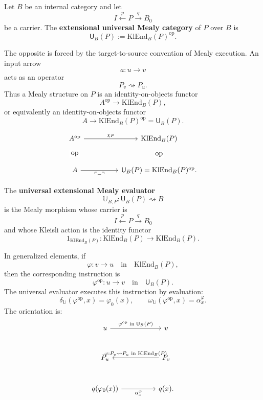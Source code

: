 \begin{definition}
Let \(B\) be an internal category and let
\[
        I \xleftarrow{p} P \xrightarrow{q} B_0
\]
be a carrier.  The \textbf{extensional universal Mealy category} of \(P\) over \(B\) is
\[
        \mathsf U_B(P):=\mathrm{KlEnd}_B(P)^{\operatorname{op}}.
\]
\end{definition}

The opposite is forced by the target-to-source convention of Mealy execution.  An input arrow
\[
        a:u\longrightarrow v
\]
acts as an operator
\[
        P_v\rightsquigarrow P_u.
\]
Thus a Mealy structure on \(P\) is an identity-on-objects functor
\[
        A^{\operatorname{op}}\longrightarrow \mathrm{KlEnd}_B(P),
\]
or equivalently an identity-on-objects functor
\[
        A\longrightarrow
        \mathrm{KlEnd}_B(P)^{\operatorname{op}}
        =
        \mathsf U_B(P).
\]

\[
\begin{tikzcd}[column sep=huge,row sep=large]
A^{\operatorname{op}}
\ar[r,"\chi_P"]
&
\mathrm{KlEnd}_B(P)
\\
A
\ar[r,"\ulcorner -\urcorner"']
\ar[u,phantom,"\operatorname{op}" description]
&
\mathsf U_B(P)=\mathrm{KlEnd}_B(P)^{\operatorname{op}}
\ar[u,phantom,"\operatorname{op}" description] .
\end{tikzcd}
\]

\begin{definition}
The \textbf{universal extensional Mealy evaluator}
\[
        \mathbb U_{B,P}:\mathsf U_B(P)\rightsquigarrow B
\]
is the Mealy morphism whose carrier is
\[
        I\xleftarrow{p}P\xrightarrow{q}B_0
\]
and whose Kleisli action is the identity functor
\[
        1_{\mathrm{KlEnd}_B(P)}:
        \mathrm{KlEnd}_B(P)\longrightarrow \mathrm{KlEnd}_B(P).
\]
\end{definition}

In generalized elements, if
\[
        \varphi:v\longrightarrow u
        \quad\text{in}\quad
        \mathrm{KlEnd}_B(P),
\]
then the corresponding instruction is
\[
        \varphi^{\operatorname{op}}:u\longrightarrow v
        \quad\text{in}\quad
        \mathsf U_B(P).
\]
The universal evaluator executes this instruction by evaluation:
\[
        \delta_{\mathbb U}(\varphi^{\operatorname{op}},x)=\varphi_0(x),
        \qquad
        \omega_{\mathbb U}(\varphi^{\operatorname{op}},x)=\alpha_x^\varphi.
\]
The orientation is:
\[
\begin{tikzcd}[column sep=huge,row sep=large]
u
\ar[r,"{\varphi^{\operatorname{op}}\text{ in }\mathsf U_B(P)}"]
&
v
\\
P_u
&
P_v
\ar[l,swap,"{\varphi:P_v\rightsquigarrow P_u\text{ in }\mathrm{KlEnd}_B(P)}"]
\\
q(\varphi_0(x))
\ar[r,swap,"{\alpha_x^\varphi}"]
&
q(x) .
\end{tikzcd}
\]


